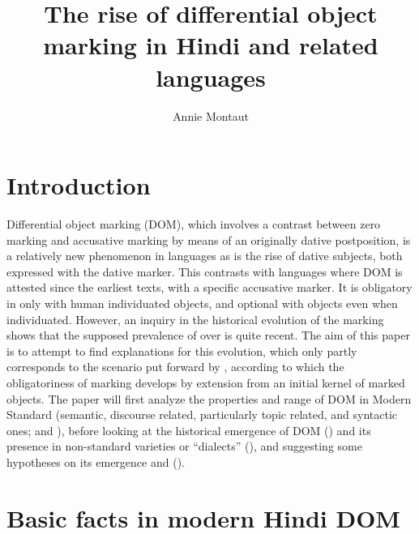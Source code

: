 \documentclass[output=paper]{LSP/langsci}
\author{Annie Montaut\affiliation{INALCO, Paris (SEDYL UMR 8002, CNRS/INALCO/IRD), Labex 083 (Empirical Foundations of Linguistics)}}
\title{The rise of differential object marking in Hindi and related languages}
\begin{document}
\section{Introduction}
\label{10-mo-sec:1}

Differential object marking (DOM), which involves a contrast between zero marking and accusative marking by means of an originally dative postposition, is a relatively new phenomenon in  languages \citep{Masica1982Identified} as is the rise of dative  subjects, both expressed with the dative marker. This contrasts with  languages where DOM is attested since the earliest texts, with a specific accusative marker. It is obligatory in  only with human individuated objects, and optional with  objects even when individuated. However, an inquiry in the historical evolution of the marking shows that the supposed prevalence of  over  is quite recent. The aim of this paper is to attempt to find explanations for this evolution, which only partly corresponds to the scenario put forward by \citet{Aissen2003Differential}, according to which the obligatoriness of marking develops by extension from an initial kernel of marked objects. The paper will first analyze the properties and range of DOM in Modern Standard  (semantic, discourse related, particularly topic related, and syntactic ones;  and ), before looking at the historical emergence of DOM () and its presence in non-standard varieties or “dialects” (), and suggesting some hypotheses on its emergence and  (). 

\section{Basic facts in modern Hindi DOM}
\label{10-mo-sec:2}
\end{document}
